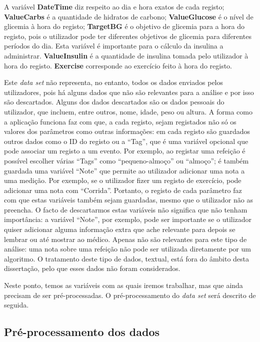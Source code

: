 A variável \textbf{DateTime} diz respeito ao dia e hora exatos de cada registo;
\textbf{Value\textunderscore Carbs} é a quantidade de hidratos de carbono;
\textbf{Value\textunderscore Glucose} é o nível de glicemia à hora do registo;
\textbf{Target\textunderscore BG} é o objetivo de glicemia para a hora do registo, pois o utilizador pode ter diferentes objetivos de glicemia para diferentes períodos do dia. Esta variável é importante para o cálculo da insulina a administrar.
\textbf{Value\textunderscore Insulin} é a quantidade de insulina tomada pelo utilizador à hora do registo.
\textbf{Exercise} corresponde ao exercício feito à hora do registo.\newline

Este \textit{data set} não representa, no entanto, todos os dados enviados pelos utilizadores, pois há alguns dados que não são relevantes para a análise e por isso são descartados. Alguns dos dados descartados são os dados pessoais do utilizador, que incluem, entre outros, nome, idade, peso ou altura. A forma como a aplicação funciona faz com que, a cada registo, sejam registados não só os valores dos parâmetros como outras informações: em cada registo são guardados outros dados como o ID do registo ou a ``Tag'', que é uma variável opcional que pode associar um registo a um evento. Por exemplo, ao registar uma refeição é possível escolher várias ``Tags'' como ``pequeno-almoço'' ou ``almoço''; é também guardada uma variável ``Note'' que permite ao utilizador adicionar uma nota a uma medição. Por exemplo, se o utilizador fizer um registo de exercício, pode adicionar uma nota com ``Corrida''. Portanto, o registo de cada parâmetro faz com que estas variáveis também sejam guardadas, mesmo que o utilizador não as preencha. O facto de descartarmos estas variáveis não significa que não tenham importância: a variável ``Note'', por exemplo, pode ser importante se o utilizador quiser adicionar alguma informação extra que ache relevante para depois se lembrar ou até mostrar ao médico. Apenas não são relevantes para este tipo de análise: uma nota sobre uma refeição não pode ser utilizada diretamente por um algoritmo. O tratamento deste tipo de dados, textual, está fora do âmbito desta dissertação, pelo que esses dados não foram considerados.

Neste ponto, temos as variáveis com as quais iremos trabalhar, mas que ainda precisam de ser pré-processadas. O pré-processamento do \textit{data set} será descrito de seguida.

\subsection{Pré-processamento dos dados}

